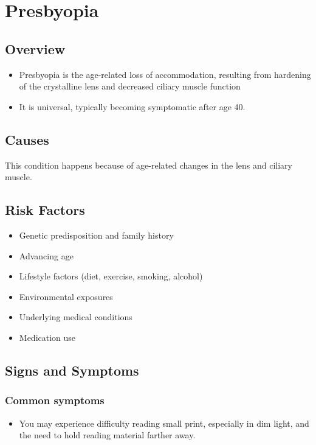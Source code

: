 \chapter{Presbyopia}
\label{sec:Presbyopia}

\section{Overview}


\begin{itemize}[noitemsep]
  \item Presbyopia is the age-related loss of accommodation, resulting from hardening of the crystalline lens and decreased ciliary muscle function
  \item It is universal, typically becoming symptomatic after age 40.
\end{itemize}
\section{Causes}
This condition happens because of age-related changes in the lens and ciliary muscle.     
\section{Risk Factors}

\begin{itemize}[noitemsep]
  \item Genetic predisposition and family history
  \item Advancing age
  \item Lifestyle factors (diet, exercise, smoking, alcohol)
  \item Environmental exposures
  \item Underlying medical conditions
  \item Medication use
\end{itemize}
\section{Signs and Symptoms}

\subsection{Common symptoms}
\begin{itemize}[noitemsep]
  \item You may experience difficulty reading small print, especially in dim light, and the need to hold reading material farther away. 
  \end{itemize}

